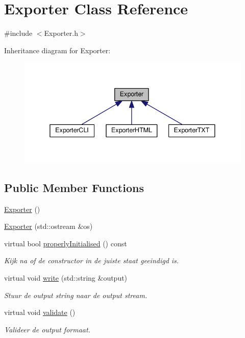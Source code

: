 \hypertarget{class_exporter}{}\section{Exporter Class Reference}
\label{class_exporter}


{\ttfamily \#include $<$Exporter.\+h$>$}



Inheritance diagram for Exporter\+:\nopagebreak
\begin{figure}[H]
\begin{center}
\leavevmode
\includegraphics[width=338pt]{class_exporter__inherit__graph}
\end{center}
\end{figure}
\subsection*{Public Member Functions}
\begin{DoxyCompactItemize}
\item 
\hyperlink{class_exporter_a2a977cb5ac8f637fcb570e73f650eca0}{Exporter} ()
\item 
\hyperlink{class_exporter_aa0dd651db7d938f6bc104c603937c6f2}{Exporter} (std\+::ostream \&os)
\item 
virtual bool \hyperlink{class_exporter_aafd9df9210aeefd7bb7fd434fc317cf0}{properly\+Initialised} () const
\begin{DoxyCompactList}\small\item\em Kijk na of de constructor in de juiste staat geeindigd is. \end{DoxyCompactList}\item 
virtual void \hyperlink{class_exporter_ac095b6486da16ffc76539f8c6c67be70}{write} (std\+::string \&output)
\begin{DoxyCompactList}\small\item\em Stuur de output string naar de output stream. \end{DoxyCompactList}\item 
virtual void \hyperlink{class_exporter_a190fe737bcda2a55707ae51b731d11a5}{validate} ()
\begin{DoxyCompactList}\small\item\em Valideer de output formaat. \end{DoxyCompactList}\end{DoxyCompactItemize}


